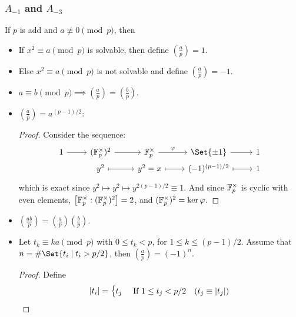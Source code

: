 \subsubsection{$A_{-1}$ and $A_{-3}$}

\begin{definition}
  If $p$ is add and $a \not\equiv 0 \pmod{p}$, then
  \begin{itemize}
    \item If $x^2 \equiv a \pmod{p}$ is solvable, then define $\left( \frac{a}{p} \right) = 1$.
    \item Else $x^2 \equiv a \pmod{p}$ is not solvable and define $\left( \frac{a}{p} \right) = -1$.
  \end{itemize}
\end{definition}

\begin{prop} \hfill
  \begin{itemize}
    \item $a \equiv b \pmod{p} \implies \left( \frac{a}{p} \right) = \left( \frac{b}{p} \right)$.
    \item $\left( \frac{a}{p} \right) = a^{(p-1)/2}$:
      \begin{proof}
      Consider the sequence:
      \[ \begin{tikzcd}[row sep = 0]
          1 \ar[r] & (\Fb_p^\times)^2 \ar[r] & \Fb_p^\times \ar[r, "\varphi"] & \Set{\pm 1} \ar[r] & 1 \\
          & y^2 \ar[r, mapsto] & y^2=x \ar[r, mapsto] & (-1)^{(p-1)/2} \ar[r, mapsto] & 1 \\
      \end{tikzcd} \]
      which is exact since $y^2 \mapsto y^2 \mapsto y^{2 (p-1)/2} \equiv 1$.
      And since $\mathbb{F}_p^\times$ is cyclic with even elements,
      $\big[\mathbb{F}_p^\times: (\mathbb{F}_p^\times)^2 \big] = 2$, and $(\mathbb{F}_p^\times)^2 = \ker \varphi$.
      \end{proof}
    \item $\left( \frac{ab}{p} \right) = \left( \frac{a}{p} \right) \left( \frac{b}{p} \right)$.
    \item Let $t_k \equiv ka \pmod{p}$ with $0 \leq t_k < p$, for $1 \leq k \leq (p-1)/2$.
      Assume that $n = \# \Set{t_i \mid t_i > p/2}$, then $\left(\frac{a}{p}\right) = (-1)^n$.
      \begin{proof}
        Define
        \[ \lvert t_i\rvert = \begin{cases}
            t_j & \text{ If } 1 \leq t_j < p/2 \quad (t_j \equiv \lvert t_j\rvert) \\

\end{cases}\]
\end{proof}
\end{itemize}
\end{prop}
